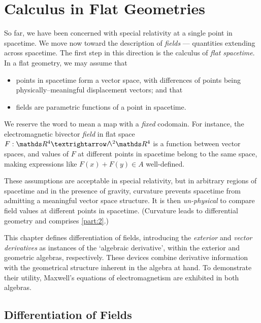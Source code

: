 \chapter{Calculus in Flat Geometries}

So far, we have been concerned with special relativity at a single point in spacetime.
We move now toward the description of \emph{fields} --- quantities extending across spacetime.
The first step in this direction is the calculus of \emph{flat spacetime}.
In a flat geometry, we may assume that
\begin{itemize}
	\item points in spacetime form a vector space, with differences of points being physically--meaningful displacement vectors; and that
	\item fields are parametric functions of a point in spacetime.
\end{itemize}
We reserve the word  to mean a map with a \emph{fixed} codomain.
For instance, the electromagnetic bivector \emph{field} in flat space $F : \RR^4 → \EA[2]{\RR^4}$ is a function between vector spaces, and values of $F$ at different points in spacetime belong to the same space, making expressions like $F(x) + F(y) ∈ A$ well-defined.

These assumptions are acceptable in special relativity, but in arbitrary regions of spacetime and in the presence of gravity, curvature prevents spacetime from admitting a meaningful vector space structure.
It is then \emph{un-physical} to compare field values at different points in spacetime.
(Curvature leads to differential geometry and comprises \cref{part:2}.)

This chapter defines differentiation of fields, introducing the \emph{exterior} and \emph{vector derivatives} as instances of the `algebraic derivative', within the exterior and geometric algebras, respectively.
These devices combine derivative information with the geometrical structure inherent in the algebra at hand.
To demonstrate their utility, Maxwell's equations of electromagnetism are exhibited in both algebras.


\section{Differentiation of Fields}
\label{sec:algder}

